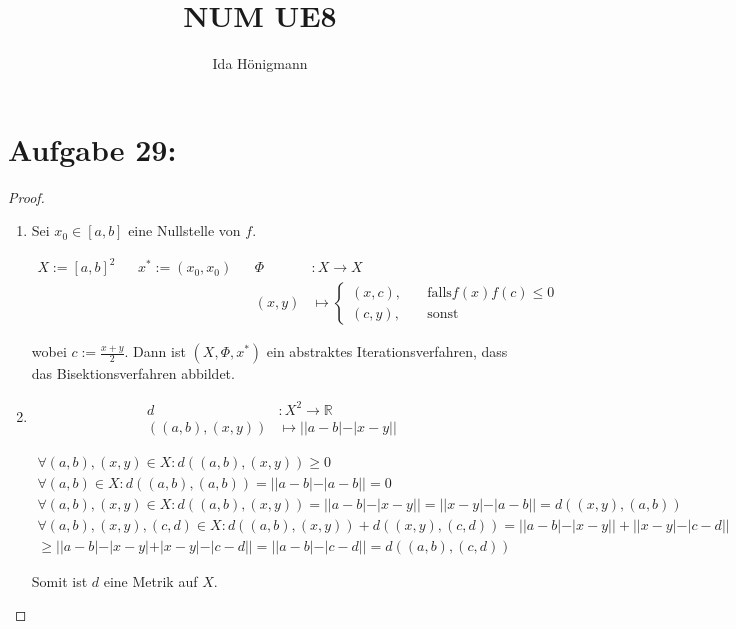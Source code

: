 \documentclass[]{article}
\title{NUM UE8}
\author{Ida Hönigmann}
\begin{document}
\maketitle

\section{Aufgabe 29:}

\begin{proof}
	\begin{enumerate}[label=\alph*)]
		\item 
		
		Sei $x_0 \in [a,b]$ eine Nullstelle von $f$.
		
		\begin{align*}
			X := [a,b]^2 && x^* := (x_0, x_0) && \Phi &: X \rightarrow X \\
			&& && (x, y) &\mapsto \begin{cases}
				(x, c), &\quad\text{falls} f(x)f(c)\le 0 \\
				(c, y), &\quad\text{sonst}
			\end{cases}
		\end{align*}
		
		wobei $c:=\frac{x+y}{2}$. Dann ist $(X, \Phi, x^*)$ ein abstraktes Iterationsverfahren, dass das Bisektionsverfahren abbildet.
		
		\item
		
		\begin{align*}
			d &:X^2\rightarrow\mathbb{R} \\
			((a,b),(x,y))&\mapsto ||a - b| - |x - y||
		\end{align*}
		
		\begin{align*}
			\forall (a,b), (x,y) \in X: d((a,b),(x,y))\geq 0\\
			\forall (a,b) \in X: d((a,b),(a,b)) = ||a - b| - |a - b|| = 0\\
			\forall (a,b), (x,y) \in X: d((a,b),(x,y)) = ||a - b| - |x - y|| = ||x - y| - |a - b|| = d((x,y),(a,b))\\
			\forall (a,b), (x,y), (c,d) \in X: d((a,b),(x,y)) + d((x,y), (c,d)) = ||a - b| - |x - y|| + ||x - y| - |c - d|| \\
			\geq ||a - b| - |x - y| + |x - y| - |c - d|| = ||a - b| - |c - d|| = d((a,b), (c,d))
		\end{align*}
		
		Somit ist $d$ eine Metrik auf $X$.
		

\end{enumerate}
\end{proof}
\end{document}

